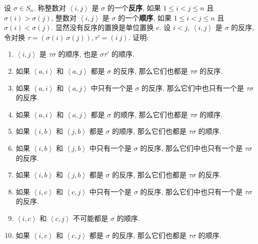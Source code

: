 \documentclass{ctexart}
\begin{document}
\begin{exercisec}[2.3.4]\label{ex2.3.4}
    设 $\sigma\in S_n$. 称整数对 $\left<i,j\right>$ 是 $\sigma$ 的一个\textbf{反序}, 如果 $1\leq i<j\leq n$ 且 $\sigma(i)>\sigma(j)$, 整数对 $\left<i,j\right>$ 是 $\sigma$ 的一个\textbf{顺序}, 如果 $1\leq i<j\leq n$ 且 $\sigma(i)<\sigma(j)$. 显然没有反序的置换是单位置换 $e$. 设 $i<j$, $\left<i,j\right>$ 是 $\sigma$ 的反序, 令对换 $\tau=(\sigma(i)\ \sigma(j)),\tau'=(i\ j)$. 证明:
    \begin{enumerate}
        \def\labelenumi{(\arabic{enumi})}
        \item $\left<i,j\right>$ 是 $\tau\sigma$ 的顺序, 也是 $\sigma\tau'$ 的顺序.
        \item 如果 $\left<a,i\right>$ 和 $\left<a,j\right>$ 都是 $\sigma$ 的反序, 那么它们也都是 $\tau\sigma$ 的反序.
        \item 如果 $\left<a,i\right>$ 和 $\left<a,j\right>$ 中只有一个是 $\sigma$ 的反序, 那么它们中也只有一个是 $\tau\sigma$ 的反序.
        \item 如果 $\left<a,i\right>$ 和 $\left<a,j\right>$ 都是 $\sigma$ 的顺序, 那么它们也都是 $\tau\sigma$ 的顺序.
        \item 如果 $\left<i,b\right>$ 和 $\left<j,b\right>$ 都是 $\sigma$ 的顺序, 那么它们也都是 $\tau\sigma$ 的顺序.
        \item 如果 $\left<i,b\right>$ 和 $\left<j,b\right>$ 中只有一个是 $\sigma$ 的反序, 那么它们中也只有一个是 $\tau\sigma$ 的反序.
        \item 如果 $\left<i,b\right>$ 和 $\left<j,b\right>$ 都是 $\sigma$ 的反序, 那么它们也都是 $\tau\sigma$ 的反序.
        \item 如果 $\left<i,c\right>$ 和 $\left<c,j\right>$ 中只有一个是 $\sigma$ 的反序, 那么它们中也只有一个是 $\tau\sigma$ 的反序.
        \item $\left<i,c\right>$ 和 $\left<c,j\right>$ 不可能都是 $\sigma$ 的顺序.
        \item 如果 $\left<i,c\right>$ 和 $\left<c,j\right>$ 都是 $\sigma$ 的反序, 那么它们也都是 $\tau\sigma$ 的顺序.
    \end{enumerate}
\end{exercisec}
\end{document}
